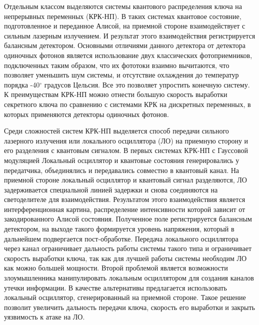 Отдельным классом выделяются системы квантового распределения ключа на непрерывных переменных (КРК-НП). В таких системах квантовое состояние, подготовленное и переданное Алисой, на приемной стороне взаимодействует с сильным лазерным излучением. И результат этого взаимодействия регистрируется балансным детектором. Основными отличиями данного детектора от детектора одиночных фотонов является использование двух классических фотоприемников, подключенных таким образом, что их фототоки взаимно вычитаются, что позволяет уменьшить шум системы, и отсутствие охлаждения до температур порядка -40$^{\circ}$  градусов Цельсия. Все это позволяет упростить конечную систему. К преимуществам КРК-НП можно отнести большую скорость выработки секретного ключа по сравнению с системами КРК на дискретных переменных, в которых применяются детекторы одиночных фотонов. 

Среди сложностей систем КРК-НП выделяется способ передачи сильного лазерного излучения или локального осциллятора (ЛО) на приемную сторону и его разделения с квантовым сигналом. В первых системах КРК-НП с Гауссовой модуляцией Локальный осциллятор и квантовые состояния генерировались у передатчика, объединялись и передавались совместно в квантовый канал. На приемной стороне локальный осциллятор и квантовый сигнал разделяются, ЛО задерживается специальной линией задержки и снова соединяются на светоделителе для взаимодействия. Результатом этого взаимодействия является интерференционная картина, распределение интенсивности которой зависит от закодированного Алисой состояния. Полученное поле регистрируется балансным детектором, на выходе такого формируется уровень напряжения, который в дальнейшем подвергается пост-обработке.  Передача локального осциллятора через канал ограничивает дальность работы системы такого типа и ограничивает скорость выработки ключа, так как для лучшей работы системы необходим ЛО как можно большей мощности. Второй проблемой является возможности злоумышленника манипулировать локальным осциллятором для создания каналов утечки информации. В качестве альтернативы предлагается использовать локальный осциллятор, сгенерированный на приемной стороне. Такое решение позволит увеличить дальность передачи ключа, скорость его выработки и закрыть уязвимость к атаке на ЛО.


